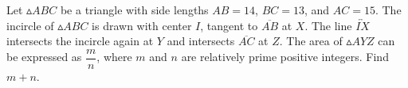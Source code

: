Let $\vartriangle ABC$ be a triangle with side lengths $AB = 14$, $BC = 13$, and $AC = 15$. The incircle of $\vartriangle ABC$ is drawn with center $I$, tangent to $\overline{AB}$ at $X$. The line $\overleftrightarrow{IX}$ intersects the incircle again at $Y$ and intersects $\overline{AC}$ at $Z$. The area of $\vartriangle AYZ$ can be expressed as $\dfrac{m}{n}$, where  $m$ and $n$ are relatively prime positive integers. Find $m + n$.
